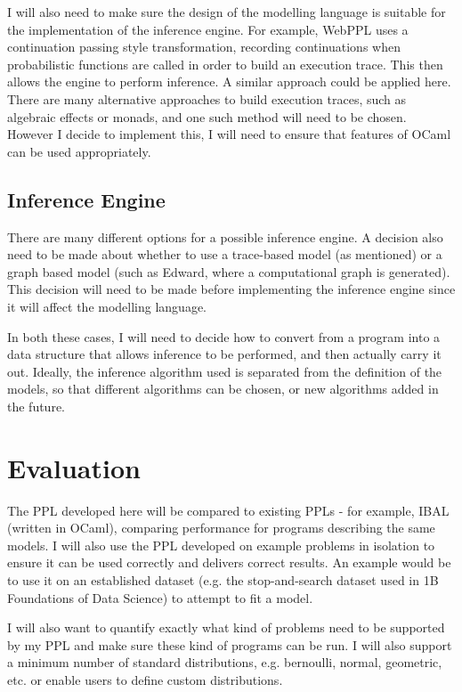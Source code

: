 I will also need to make sure the design of the modelling language is suitable for the implementation of the inference engine. For example, WebPPL\cite{mobus2018structure} uses a continuation passing style transformation, recording continuations when probabilistic functions are called in order to build an execution trace. This then allows the engine to perform inference. A similar approach could be applied here. There are many alternative approaches to build execution traces, such as algebraic effects\cite{DBLP:journals/corr/abs-1811-06150} or monads\cite{scibior2015practical}, and one such method will need to be chosen. However I decide to implement this, I will need to ensure that features of OCaml can be used appropriately.

\subsection*{Inference Engine}
There are many different options for a possible inference engine. A decision also need to be made about whether to use a trace-based model (as mentioned) or a graph based model (such as Edward, where a computational graph is generated). This decision will need to be made before implementing the inference engine since it will affect the modelling language.

In both these cases, I will need to decide how to convert from a program into a data structure that allows inference to be performed, and then actually carry it out. Ideally, the inference algorithm used is separated from the definition of the models, so that different algorithms can be chosen, or new algorithms added in the future.

\section*{Evaluation}

The PPL developed here will be compared to existing PPLs - for example, IBAL (written in OCaml), comparing performance for programs describing the same models. I will also use the PPL developed on example problems in isolation to ensure it can be used correctly and delivers correct results. An example would be to use it on an established dataset (e.g. the stop-and-search dataset used in 1B Foundations of Data Science) to attempt to fit a model.

I will also want to quantify exactly what kind of problems need to be supported by my PPL and make sure these kind of programs can be run. I will also support a minimum number of standard distributions, e.g. bernoulli, normal, geometric, etc. or enable users to define custom distributions.

